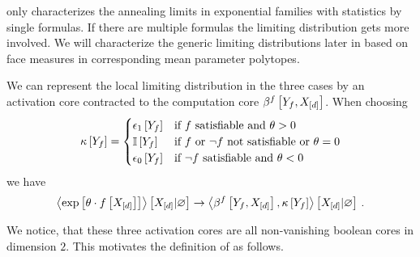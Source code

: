  only characterizes the annealing limits in exponential families with statistics by single formulas.
If there are multiple formulas the limiting distribution gets more involved.
We will characterize the generic limiting distributions later in  based on face measures in corresponding mean parameter polytopes.


We can represent the local limiting distribution in the three cases by an activation core contracted to the computation core $\beta^{f}\left[Y_{f},X_{[d]}\right]$.
When choosing
\begin{align*}
    \kappa\left[Y_{f}\right] =
    \begin{cases}
        \epsilon_1\left[Y_{f}\right] & \text{if $f$ satisfiable and } \theta>0\\
        \mathbb{I}\left[Y_{f}\right] & \text{if $f$ or $\lnot f$ not satisfiable or } \theta=0 \\
        \epsilon_0\left[Y_{f}\right] & \text{if $\lnot f$ satisfiable and } \theta<0\\
    \end{cases}
\end{align*}
we have
\begin{align*}
    \left\langle \mathrm{exp}\left[\theta\cdot f\left[X_{[d]}\right]\right]\right\rangle \left[ X_{[d]} | \varnothing \right] \rightarrow
    \left\langle \beta^{f}\left[Y_{f},X_{[d]}\right],\kappa\left[Y_{f}\right]\right\rangle \left[ X_{[d]} | \varnothing \right] \, .
\end{align*}

We notice, that these three activation cores are all non-vanishing boolean cores in dimension $2$.
This motivates the definition of \HardLogicNetworks{} as follows.

